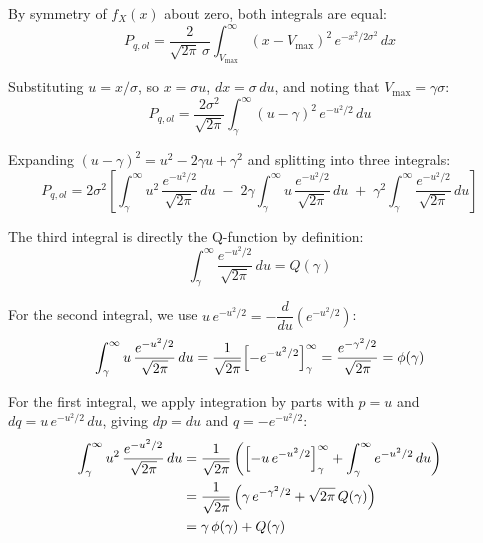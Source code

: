 \documentclass{article}
\begin{document}
By symmetry of $f_X(x)$ about zero, both integrals are equal:
\begin{equation}
    P_{q,ol} = \frac{2}{\sqrt{2\pi}\,\sigma}
               \int_{V_{\max}}^{\infty} (x - V_{\max})^2\,
               e^{-x^2/2\sigma^2}\,dx
\end{equation}

Substituting $u = x/\sigma$, so $x = \sigma u$, $dx = \sigma\,du$, 
and noting that $V_{\max} = \gamma\sigma$:
\begin{equation}
    P_{q,ol} = \frac{2\sigma^2}{\sqrt{2\pi}}
               \int_{\gamma}^{\infty} (u - \gamma)^2\,
               e^{-u^2/2}\,du
\end{equation}

Expanding $(u-\gamma)^2 = u^2 - 2\gamma u + \gamma^2$ and splitting 
into three integrals:
\begin{equation}
    P_{q,ol} = 2\sigma^2 \left[
        \int_{\gamma}^{\infty} u^2\,\frac{e^{-u^2/2}}{\sqrt{2\pi}}\,du
        \;-\; 2\gamma \int_{\gamma}^{\infty} u\,\frac{e^{-u^2/2}}{\sqrt{2\pi}}\,du
        \;+\; \gamma^2 \int_{\gamma}^{\infty} \frac{e^{-u^2/2}}{\sqrt{2\pi}}\,du
    \right]
\end{equation}

The third integral is directly the Q-function by definition:
\begin{equation}
    \int_{\gamma}^{\infty} \frac{e^{-u^2/2}}{\sqrt{2\pi}}\,du = Q(\gamma)
\end{equation}

For the second integral, we use $u\,e^{-u^2/2} = 
-\dfrac{d}{du}\!\left(e^{-u^2/2}\right)$:
\begin{equation}
    \int_{\gamma}^{\infty} u\,\frac{e^{-u^2/2}}{\sqrt{2\pi}}\,du
    = \frac{1}{\sqrt{2\pi}}\Bigl[-e^{-u^2/2}\Bigr]_{\gamma}^{\infty}
    = \frac{e^{-\gamma^2/2}}{\sqrt{2\pi}}
    = \phi(\gamma)
\end{equation}

For the first integral, we apply integration by parts with 
$p = u$ and $dq = u\,e^{-u^2/2}\,du$, giving $dp = du$ and 
$q = -e^{-u^2/2}$:
\begin{align}
    \int_{\gamma}^{\infty} u^2\,\frac{e^{-u^2/2}}{\sqrt{2\pi}}\,du
    &= \frac{1}{\sqrt{2\pi}}\left(
        \Bigl[-u\,e^{-u^2/2}\Bigr]_{\gamma}^{\infty}
        + \int_{\gamma}^{\infty} e^{-u^2/2}\,du
       \right) \nonumber\\
    &= \frac{1}{\sqrt{2\pi}}\left(
        \gamma\,e^{-\gamma^2/2}
        + \sqrt{2\pi}\,Q(\gamma)
       \right) \nonumber\\
    &= \gamma\,\phi(\gamma) + Q(\gamma)
\end{align}
\end{document}

